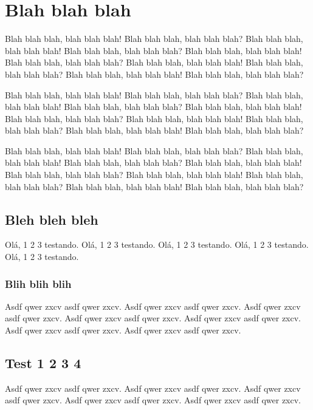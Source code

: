 \chapter{Blah blah blah}
\label{cap:fundamentos}

Blah blah blah, blah blah blah! Blah blah blah, blah blah blah?
Blah blah blah, blah blah blah! Blah blah blah, blah blah blah?
Blah blah blah, blah blah blah! Blah blah blah, blah blah blah?
Blah blah blah, blah blah blah! Blah blah blah, blah blah blah?
Blah blah blah, blah blah blah! Blah blah blah, blah blah blah?

Blah blah blah, blah blah blah! Blah blah blah, blah blah blah?
Blah blah blah, blah blah blah! Blah blah blah, blah blah blah?
Blah blah blah, blah blah blah! Blah blah blah, blah blah blah?
Blah blah blah, blah blah blah! Blah blah blah, blah blah blah?
Blah blah blah, blah blah blah! Blah blah blah, blah blah blah?

Blah blah blah, blah blah blah! Blah blah blah, blah blah blah?
Blah blah blah, blah blah blah! Blah blah blah, blah blah blah?
Blah blah blah, blah blah blah! Blah blah blah, blah blah blah?
Blah blah blah, blah blah blah! Blah blah blah, blah blah blah?
Blah blah blah, blah blah blah! Blah blah blah, blah blah blah?

\section{Bleh bleh bleh}
\label{subsec:tbloc}

Olá, 1 2 3 testando.
Olá, 1 2 3 testando.
Olá, 1 2 3 testando.
Olá, 1 2 3 testando.
Olá, 1 2 3 testando.

\subsection{Blih blih blih} 
 
Asdf qwer zxcv asdf qwer zxcv.
Asdf qwer zxcv asdf qwer zxcv.
Asdf qwer zxcv asdf qwer zxcv.
Asdf qwer zxcv asdf qwer zxcv.
Asdf qwer zxcv asdf qwer zxcv.
Asdf qwer zxcv asdf qwer zxcv.
Asdf qwer zxcv asdf qwer zxcv.


\section{Test 1 2 3 4}
\label{sec:lateracao}
 
Asdf qwer zxcv asdf qwer zxcv.
Asdf qwer zxcv asdf qwer zxcv.
Asdf qwer zxcv asdf qwer zxcv.
Asdf qwer zxcv asdf qwer zxcv.
Asdf qwer zxcv asdf qwer zxcv.

